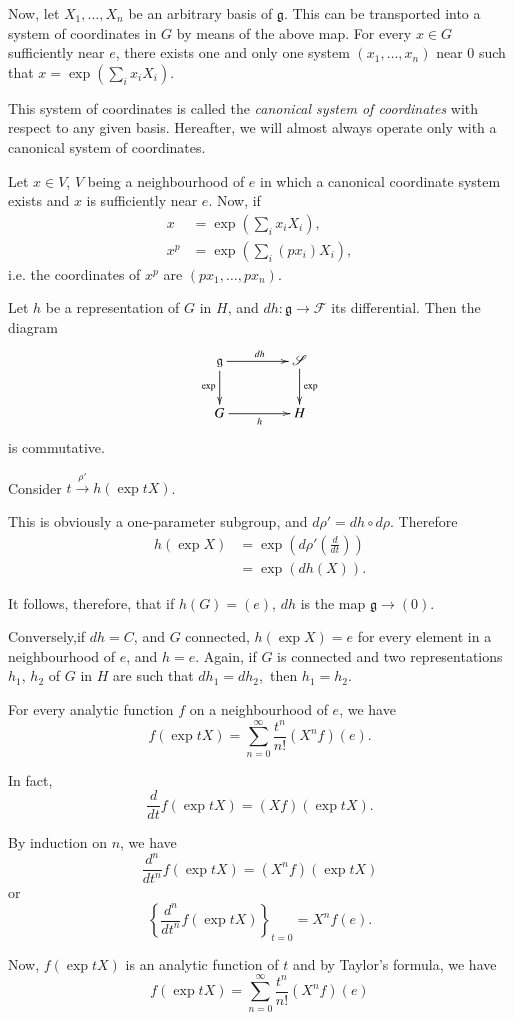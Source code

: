 Now, let $X_1,\ldots, X_n$ be an arbitrary basis of $\mathfrak{g}$.
This can be transported into a system of coordinates in $G$ by means
of the above map. For every $x \in G$ sufficiently near $e$, there
exists one and only one system $(x_1,\ldots,x_n)$ near $0$ such that
$x=\exp(\sum_{i} x_i X_i)$. 
 
This system of coordinates is called the \textit{canonical system of
  coordinates} with respect to any given basis. Hereafter, we will
almost always operate only with a canonical system of coordinates. 
 
\begin{remark*}%
 Let $x \in V$, $V$ being a neighbourhood of $e$ in which a canonical
 coordinate system exists and $x$ is sufficiently near $e$. Now, if  
\begin{align*}
 x & = \exp(\sum_{i} x_i X_i),\\
 x^p & = \exp (\sum_{i}(p x_i)X_i),
\end{align*}
i.e. the coordinates of $x^p$ are $(px_1,\ldots,px_n)$.
\end{remark*}

 \begin{proposition}\label{chap3-prop5}%
 Let $h$ be a representation of $G$ in $H$, and
 $dh:\mathfrak{g}\rightarrow \mathcal{F}$ its differential. Then the
 diagram 
\[
\xymatrix@C=1.5cm{
\mathfrak{g}\ar[d]_{\exp}\ar[r]^{dh} & \mathscr{S}\ar[d]^{\exp}\\
G\ar[r]_{h} & H
}
\]
is commutative.
\end{proposition} 
 
Consider $t \xrightarrow{\rho'} h (\exp  tX)$.
 
This is obviously a one-parameter subgroup, and $d \rho'= dh\circ
d\rho$. 
Therefore
\begin{align*}
h(\exp X) &=\exp(d\rho'(\frac{d}{dt}))\\
 &= \exp (dh (X)).
\end{align*}

It follows, therefore, that if $h(G)=(e)$, $dh$ is the map
$\mathfrak{g}\rightarrow(0)$. 
 
 Conversely,\pageoriginale if $dh=C$, and $G$ connected, $h(\exp X)=e$ for every
 element in a neighbourhood of $e$, and $h=e$. Again, if $G$ is
 connected and two representations $h_1$, $h_2$ of $G$ in $H$ are such
 that $dh_1=dh_2,$ then $h_1=h_2$. 
 
\begin{proposition}\label{chap3-prop6}%
For every analytic function $f$ on a neighbourhood of $e$, we have 
$$
f(\exp tX)=\sum^{\infty}_{n=0} \dfrac{t^n}{n!}(X^n f)(e). 
$$

In fact, 
$$
\dfrac{d}{dt} f(\exp tX)=(X f) (\exp tX).
$$

By induction on $n$, we have
$$
\dfrac{d^n}{dt^n} f (\exp tX)=(X^n f)(\exp tX)
$$
or
$$
\left\{\dfrac{d^n}{dt^n} f(\exp tX)\right\}_{t=0}=X^n f(e).
$$

Now, $f(\exp t X)$ is an analytic function of $t$ and by Taylor's
formula, we have  
$$
f(\exp tX)=\sum^{\infty}_{n=0} \dfrac{t^n}{n!}(X^n f)(e)
$$
\end{proposition}

